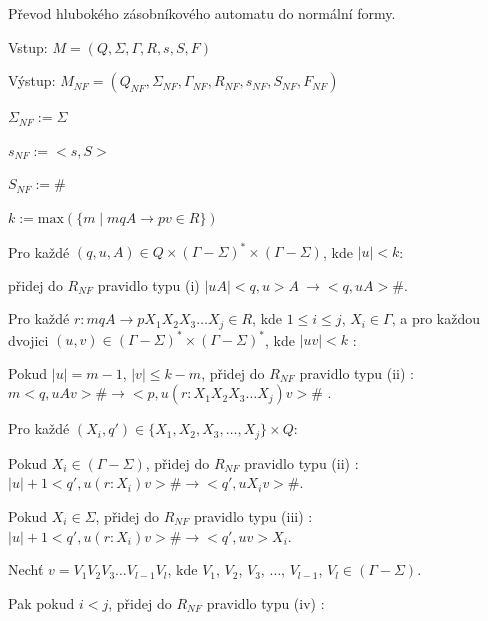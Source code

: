 \begin{Alg}\label{alg_NF}
Převod hlubokého zásobníkového automatu do normální formy.

\begin{list}{}{\setlength\parsep{0cm} \setlength\itemsep{0cm} \setlength\leftmargin{1em}}
   \item Vstup: $M = (Q,\Sigma,\Gamma, R, s, S, F)$ 
   \item Výstup: $M_{NF} = (Q_{NF}, \Sigma_{NF}, {\Gamma}_{NF}, R_{NF}, s_{NF},  S_{NF}, F_{NF})$ \medskip
  
  \item ${\Sigma}_{NF} := \Sigma$
  \item $s_{NF} := <s,S>$
  \item $S_{NF} := \#$ \medskip

  \item $k := \mathrm{max}(\{m \mid mqA \rightarrow pv \in R\}) $ \medskip

  \item Pro každé $(q,u,A) \in Q \times (\Gamma - \Sigma)^* \times (\Gamma - \Sigma)$, kde $|u| < k$: \medskip

  \subitem přidej do $R_{NF}$ pravidlo typu (i) $|uA| <q,u> A~\rightarrow <q,uA> \#$. \medskip

  \item Pro každé $r : mqA \rightarrow p X_1 X_2 X_3 \dots X_j \in R$, kde $1 \le i \le j$, $X_i \in \Gamma$, a 
         pro každou dvojici $(u,v) \in (\Gamma - \Sigma)^* \times (\Gamma - \Sigma)^*$, kde $|uv| < k$ : \medskip

  \subitem Pokud $|u| = m - 1$, $|v| \le k-m$, přidej do $R_{NF}$ pravidlo typu (ii) :
  \subitem $m <q,uAv> \# \rightarrow <p,u (r : X_1 X_2 X_3 \dots X_j) v>\#$ . \medskip

  \subitem Pro každé $(X_i,q') \in \{X_1, X_2, X_3, \dots, X_j\} \times Q$: \medskip

  \subsubitem Pokud $X_i \in (\Gamma - \Sigma)$, přidej do $R_{NF}$ pravidlo typu (ii) :
  \subsubitem $|u|+1 <q',u (r : X_i) v> \# \rightarrow <q',u X_i v> \# $. \medskip

  \subsubitem Pokud $X_i \in \Sigma$, přidej do $R_{NF}$ pravidlo typu (iii) :
  \subsubitem $|u|+1 <q',u (r : X_i) v> \# \rightarrow <q',uv> X_i $.\medskip

  \subsubitem Nechť $v = V_1 V_2 V_3 \dots V_{l-1} V_l$, kde $V_1$, $V_2$, $V_3$, $\dots$, $V_{l-1}$, $V_l \in (\Gamma - \Sigma)$.

  \subsubitem Pak pokud $i < j$, přidej do $R_{NF}$ pravidlo typu (iv) :\medskip


\end{list}
\end{Alg}
